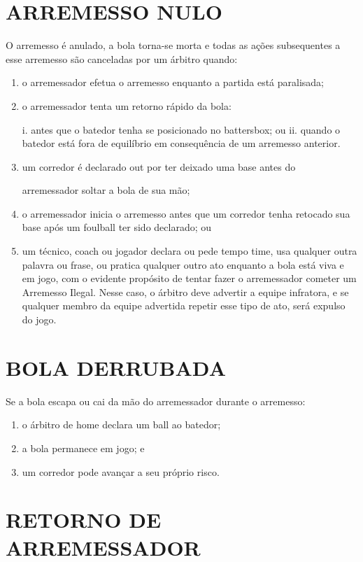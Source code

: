 \section{ARREMESSO NULO}

O arremesso é anulado, a bola torna-se morta e todas as ações subsequentes a esse arremesso são canceladas por um árbitro quando:

\begin{enumerate}[label=(\alph*)]
	\item   o arremessador efetua o arremesso enquanto a partida está paralisada;
	\item  o arremessador tenta um retorno rápido da bola:

	i. antes que o batedor tenha se posicionado no \gls{battersbox}; ou
	ii. quando o batedor está fora de equilíbrio em consequência de um arremesso anterior.

	\item  um corredor é declarado \gls{out} por ter deixado uma base antes do

	arremessador soltar a bola de sua mão;
	\item  o arremessador inicia o arremesso antes que um corredor tenha retocado sua  base após um \gls{foulball} ter sido declarado; ou
	\item  um técnico, \gls{coach} ou jogador declara ou pede tempo \gls{time}, usa qualquer outra palavra ou frase, ou pratica qualquer outro ato enquanto a bola está viva e em jogo, com o evidente propósito de tentar fazer o arremessador cometer um Arremesso Ilegal. Nesse caso, o árbitro deve advertir a equipe infratora, e se qualquer membro da equipe advertida repetir esse tipo de ato, será expulso do jogo.
\end{enumerate}
\section{BOLA DERRUBADA}

Se a bola escapa ou cai da mão do arremessador durante o arremesso:
\begin{enumerate}[label=(\alph*)]\item   o árbitro de \gls{home} declara um \gls{ball} ao batedor;
	\item  a bola permanece em jogo; e
	\item  um corredor pode avançar a seu próprio risco.
\end{enumerate}

\section{RETORNO DE ARREMESSADOR}


